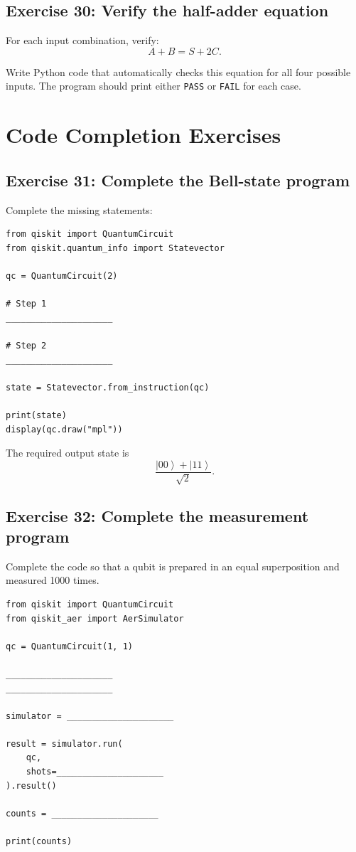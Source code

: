\documentclass[12pt,a4paper]{article}
\newcommand{\ket}[1]{\left|#1\right\rangle}
\begin{document}
\subsection*{Exercise 30: Verify the half-adder equation}
For each input combination, verify:
\[
A+B=S+2C.
\]

Write Python code that automatically checks this equation for all four possible inputs. The program should print either \texttt{PASS} or \texttt{FAIL} for each case.

\section{Code Completion Exercises}

\subsection*{Exercise 31: Complete the Bell-state program}
Complete the missing statements:
\begin{lstlisting}
from qiskit import QuantumCircuit
from qiskit.quantum_info import Statevector

qc = QuantumCircuit(2)

# Step 1
_____________________

# Step 2
_____________________

state = Statevector.from_instruction(qc)

print(state)
display(qc.draw("mpl"))
\end{lstlisting}

The required output state is
\[
\frac{\ket{00}+\ket{11}}{\sqrt{2}}.
\]

\subsection*{Exercise 32: Complete the measurement program}
Complete the code so that a qubit is prepared in an equal superposition and measured 1000 times.

\begin{lstlisting}
from qiskit import QuantumCircuit
from qiskit_aer import AerSimulator

qc = QuantumCircuit(1, 1)

_____________________
_____________________

simulator = _____________________

result = simulator.run(
    qc,
    shots=_____________________
).result()

counts = _____________________

print(counts)
\end{lstlisting}
\end{document}
